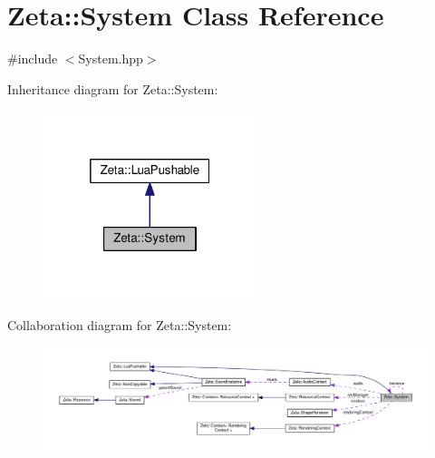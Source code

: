 \hypertarget{classZeta_1_1System}{\section{Zeta\+:\+:System Class Reference}
\label{classZeta_1_1System}
}


{\ttfamily \#include $<$System.\+hpp$>$}



Inheritance diagram for Zeta\+:\+:System\+:\nopagebreak
\begin{figure}[H]
\begin{center}
\leavevmode
\includegraphics[width=176pt]{classZeta_1_1System__inherit__graph}
\end{center}
\end{figure}


Collaboration diagram for Zeta\+:\+:System\+:\nopagebreak
\begin{figure}[H]
\begin{center}
\leavevmode
\includegraphics[width=350pt]{classZeta_1_1System__coll__graph}
\end{center}
\end{figure}
